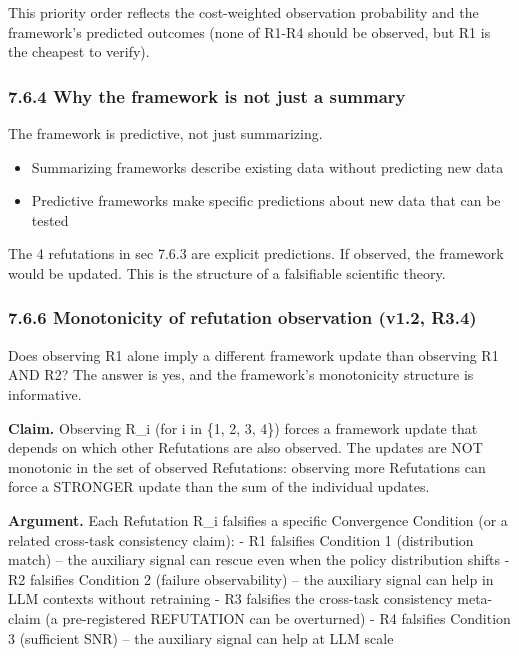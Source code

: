\documentclass[
]{article}
\newcounter{none} %
\providecommand{\tightlist}{%
  \setlength{\itemsep}{0pt}\setlength{\parskip}{0pt}}
\begin{document}
This priority order reflects the cost-weighted observation probability
and the framework's predicted outcomes (none of R1-R4 should be
observed, but R1 is the cheapest to verify).

\subsubsection{7.6.4 Why the framework is not just a
summary}\label{why-the-framework-is-not-just-a-summary}

The framework is predictive, not just summarizing.

\begin{itemize}
\tightlist
\item
  Summarizing frameworks describe existing data without predicting new
  data
\item
  Predictive frameworks make specific predictions about new data that
  can be tested
\end{itemize}

The 4 refutations in sec 7.6.3 are explicit predictions. If observed,
the framework would be updated. This is the structure of a falsifiable
scientific theory.

\subsubsection{7.6.6 Monotonicity of refutation observation (v1.2,
R3.4)}\label{monotonicity-of-refutation-observation-v1.2-r3.4}

Does observing R1 alone imply a different framework update than
observing R1 AND R2? The answer is yes, and the framework's monotonicity
structure is informative.

\textbf{Claim.} Observing R\_i (for i in \{1, 2, 3, 4\}) forces a
framework update that depends on which other Refutations are also
observed. The updates are NOT monotonic in the set of observed
Refutations: observing more Refutations can force a STRONGER update than
the sum of the individual updates.

\textbf{Argument.} Each Refutation R\_i falsifies a specific Convergence
Condition (or a related cross-task consistency claim): - R1 falsifies
Condition 1 (distribution match) -- the auxiliary signal can rescue even
when the policy distribution shifts - R2 falsifies Condition 2 (failure
observability) -- the auxiliary signal can help in LLM contexts without
retraining - R3 falsifies the cross-task consistency meta-claim (a
pre-registered REFUTATION can be overturned) - R4 falsifies Condition 3
(sufficient SNR) -- the auxiliary signal can help at LLM scale
\end{document}
